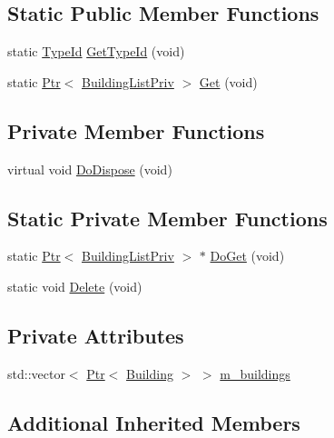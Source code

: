 \subsection*{Static Public Member Functions}
\begin{DoxyCompactItemize}
\item 
static \hyperlink{classns3_1_1TypeId}{Type\+Id} \hyperlink{classns3_1_1BuildingListPriv_a5c3e5a780d4582319e905ccbdea822a6}{Get\+Type\+Id} (void)
\item 
static \hyperlink{classns3_1_1Ptr}{Ptr}$<$ \hyperlink{classns3_1_1BuildingListPriv}{Building\+List\+Priv} $>$ \hyperlink{classns3_1_1BuildingListPriv_aab33058ff56f83a387161cd50839227d}{Get} (void)
\end{DoxyCompactItemize}
\subsection*{Private Member Functions}
\begin{DoxyCompactItemize}
\item 
virtual void \hyperlink{classns3_1_1BuildingListPriv_a944c0d54edfc767d2d80e4a83f8c56cc}{Do\+Dispose} (void)
\end{DoxyCompactItemize}
\subsection*{Static Private Member Functions}
\begin{DoxyCompactItemize}
\item 
static \hyperlink{classns3_1_1Ptr}{Ptr}$<$ \hyperlink{classns3_1_1BuildingListPriv}{Building\+List\+Priv} $>$ $\ast$ \hyperlink{classns3_1_1BuildingListPriv_a2cccdb7a1c13f0afc0809e1ea2bcbfeb}{Do\+Get} (void)
\item 
static void \hyperlink{classns3_1_1BuildingListPriv_a591d74fa815a289835c12998bd932dc9}{Delete} (void)
\end{DoxyCompactItemize}
\subsection*{Private Attributes}
\begin{DoxyCompactItemize}
\item 
std\+::vector$<$ \hyperlink{classns3_1_1Ptr}{Ptr}$<$ \hyperlink{classns3_1_1Building}{Building} $>$ $>$ \hyperlink{classns3_1_1BuildingListPriv_a02b34db9f6e8aafa9d21c19b8322a1bf}{m\+\_\+buildings}
\end{DoxyCompactItemize}
\subsection*{Additional Inherited Members}


